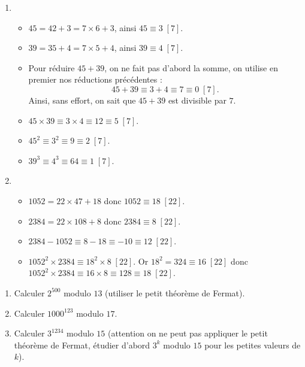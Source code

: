 \documentclass[11pt,class=report,crop=false]{standalone}
\begin{document}
\correction
\sauteligne
\begin{enumerate}
    \item 
    \begin{itemize}
        \item $45 = 42 + 3 = 7\times 6 +3$, ainsi $45 \equiv 3 \; [7]$.
        \item $39 = 35 + 4 = 7\times 5 +4$, ainsi $39 \equiv 4 \; [7]$.
        \item Pour réduire $45+39$, on ne fait pas d'abord la somme, on utilise en premier nos réductions précédentes :
        $$45+39 \equiv 3 + 4 \equiv 7 \equiv 0 \; [7].$$
        Ainsi, sans effort, on sait que $45+39$ est divisible par $7$.
        \item $45 \times 39 \equiv 3 \times 4 \equiv 12 \equiv 5 \; [7]$.
        \item $45^2 \equiv 3^2 \equiv 9 \equiv 2 \; [7]$.
        \item $39^3 \equiv 4^3 \equiv 64 \equiv 1 \; [7]$.
    \end{itemize} 
    
    \item
    \begin{itemize}
        \item $1052 = 22 \times 47 + 18$ donc $1052 \equiv 18 \; [22]$.
        \item $2384 = 22 \times 108 + 8$ donc $2384 \equiv 8 \; [22]$.
        \item $2384 -1052 \equiv  8-18 \equiv -10 \equiv 12 \; [22]$.
        \item $1052^2 \times 2384 \equiv 18^2 \times 8 \; [22]$.
        Or $18^2 = 324 \equiv 16 \; [22]$ donc $1052^2 \times 2384 \equiv 16 \times 8 \equiv 128 \equiv 18 \; [22]$.
    \end{itemize} 
    
\end{enumerate}
\fincorrection
\finexercice


\exercice{}
\enonce
\sauteligne
\begin{enumerate}
    \item Calculer $2^{500}$ modulo $13$ (utiliser le petit théorème de Fermat).
    \item Calculer $1000^{123}$ modulo $17$.  
    \item Calculer $3^{1234}$ modulo $15$ (attention on ne peut pas appliquer le petit théorème de Fermat, étudier d'abord $3^k$ modulo $15$ pour les petites valeurs de $k$).
\end{enumerate} 
\finenonce
\end{document}
